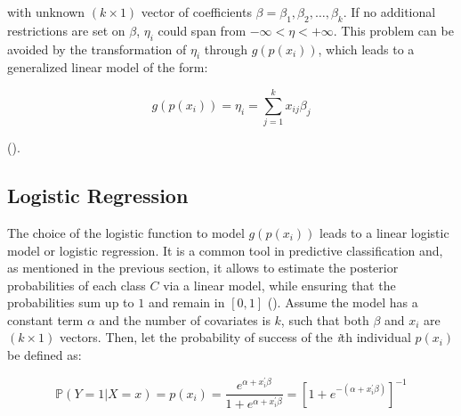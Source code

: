 with unknown $(k \times 1)$ vector of coefficients $\beta = \beta_1, \beta_2, \dots, \beta_k$. If no additional restrictions are set on $\beta$, $\eta_i$ could span from $-\infty < \eta < +\infty$. This problem can be avoided by the transformation of $\eta_i$ through $g(p(x_i))$, which leads to a generalized linear model of the form:

\begin{equation}
    g(p(x_i)) = \eta_i = \sum_{j=1}^{k} x_{ij} \beta_{j}
    \label{eqn:glm}
\end{equation}

(\cite{mccullagh1989}). 




\subsection{Logistic Regression}
\label{sec:logit}

The choice of the logistic function to model $g(p(x_i))$ leads to a linear logistic model or logistic regression. It is a common tool in predictive classification and, as mentioned in the previous section, it allows to estimate the posterior probabilities of each class $C$ via a linear model, while ensuring that the probabilities sum up to $1$ and remain in $[0,1]$ (\cite{hastie2009elements}). Assume the model has a constant term $\alpha$ and the number of covariates is $k$, such that both $\beta$ and $x_i$ are $(k \times 1)$ vectors. Then, let the probability of success of the \textit{i}th individual $p(x_i)$ be defined as: 

\begin{equation}
    \mathbb{P}(Y=1 | X=x)=p(x_i) = \frac{e^{\alpha + x_i^\prime \beta}}{1 + e^{\alpha + x_i^\prime \beta}} = \left[1 + e^{-(\alpha + x_i^\prime \beta)}\right]^{-1}
    \label{eqn:basic-prob}
\end{equation}

